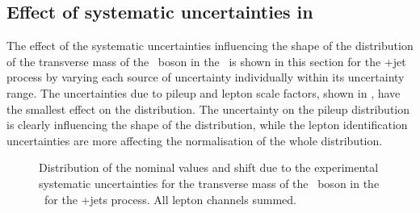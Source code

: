 \subsection{Effect of systematic uncertainties in \WZCR}
\label{sec:MTW}
The effect of the systematic uncertainties influencing the shape of the distribution of the transverse mass of the \PW\ boson in the \WZCR\ is shown in this section for the \WZ+jet process by varying each source of uncertainty individually within its uncertainty range.  The uncertainties due to pileup and lepton scale factors, shown in , have the smallest effect on the distribution. The uncertainty on the pileup distribution is clearly influencing the shape of the distribution, while the lepton identification uncertainties are more affecting the normalisation of the whole distribution. 
\begin{figure}[htbp] 
	\centering 
	\caption{Distribution of the nominal values and shift due to the experimental systematic uncertainties for the transverse mass of the \PW\ boson in the \WZCR\ for the \WZ+jets process. All lepton channels summed.}
\label{fig:shiftMTW1}
\end{figure}

